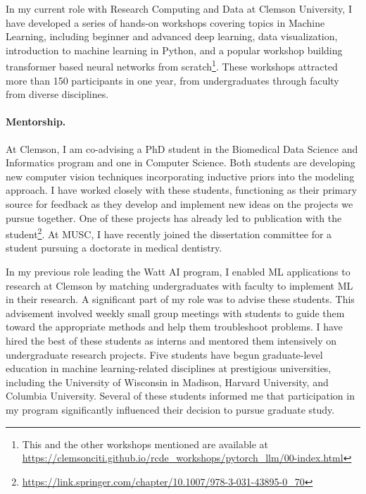 \documentclass[nobib]{tufte-handout}
\begin{document}
In my current role with Research Computing and Data at Clemson University, I have developed a series of hands-on workshops covering topics in Machine Learning, including beginner and advanced deep learning, data visualization, introduction to machine learning in Python, and a popular workshop building transformer based neural networks from scratch\thanks{This and the other workshops mentioned are available at \url{https://clemsonciti.github.io/rcde_workshops/pytorch_llm/00-index.html}}. These workshops attracted more than 150 participants in one year, from undergraduates through faculty from diverse disciplines.

\paragraph{Mentorship.} At Clemson, I am co-advising a PhD student in the Biomedical Data Science and Informatics program and one in Computer Science. Both students are developing new computer vision techniques incorporating inductive priors into the modeling approach. I have worked closely with these students, functioning as their primary source for feedback as they develop and implement new ideas on the projects we pursue together. One of these projects has already led to publication with the student\thanks{\url{https://link.springer.com/chapter/10.1007/978-3-031-43895-0_70}}. At MUSC, I have recently joined the dissertation committee for a student pursuing a doctorate in medical dentistry.

In my previous role leading the Watt AI program, I enabled ML applications to research at Clemson by matching undergraduates with faculty to implement ML in their research. A significant part of my role was to advise these students. This advisement involved weekly small group meetings with students to guide them toward the appropriate methods and help them troubleshoot problems. I have hired the best of these students as interns and mentored them intensively on undergraduate research projects. Five students have begun graduate-level education in machine learning-related disciplines at prestigious universities, including the University of Wisconsin in Madison, Harvard University, and Columbia University. Several of these students informed me that participation in my program significantly influenced their decision to pursue graduate study.
\end{document}
